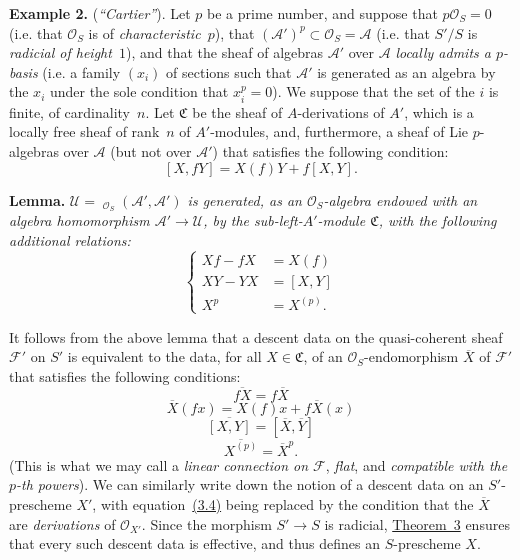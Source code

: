 \documentclass{article}
\newenvironment{itenv}[1]
  {\phantomsection\par\medskip\noindent\textbf{#1.}\itshape}
  {\par\medskip}
\newenvironment{rmenv}[1]
  {\phantomsection\par\medskip\noindent\textbf{#1.}\rmfamily}
  {\par\medskip}
\newcommand{\scr}[1]{{\mathscr{#1}}}
\renewcommand{\cal}[1]{{\mathcal{#1}}}
\newcommand{\fk}[1]{{\mathfrak{#1}}}
\DeclareMathOperator{\Hom}{Hom}
\DeclareMathOperator{\shHom}{\underline{\Hom}}
\newcommand{\oldpage}[1]{\marginpar{\footnotesize$\Big\vert$ \textit{p.~#1}}}
\begin{document}
\begin{rmenv}{Example 2}
\label{example:B.3(2)}
  (\emph{``Cartier''}).
  Let $p$ be a prime number, and suppose that $p\scr{O}_S=0$ (i.e. that $\scr{O}_S$ is of \emph{characteristic~$p$}), that $(\scr{A}')^p\subset\scr{O}_S=\scr{A}$ (i.e. that $S'/S$ is \emph{radicial of height~$1$}), and that the sheaf of algebras $\scr{A}'$ over $\scr{A}$ \emph{locally admits a $p$-basis} (i.e. a family $(x_i)$ of sections such that $\scr{A}'$ is generated as an algebra by the $x_i$ under the sole condition that $x_i^p=0$).
  We suppose that the set of the $i$ is finite, of cardinality~$n$.
  Let $\fk{C}$ be the sheaf of $A$-derivations of $A'$, which is a locally free sheaf of rank~$n$ of $A'$-modules, and, furthermore, a sheaf of Lie $p$-algebras over $\scr{A}$ (but not over $\scr{A}'$) that satisfies the following condition:
  \[
  \label{equation:B.3.5}
    [X,fY] = X(f)Y + f[X,Y].
  \tag{3.5}
  \]
\end{rmenv}

\begin{itenv}{Lemma}
  $\scr{U}=\shHom_{\scr{O}_S}(\scr{A}',\scr{A}')$ is generated, as an $\scr{O}_S$-algebra endowed with an algebra homomorphism $\scr{A}'\to\scr{U}$, by the sub-left-$A'$-module $\fk{C}$, with the following additional relations:
  \[
  \label{equation:B.3.6}
    \begin{cases}
      Xf-fX &= X(f)
    \\XY-YX &= [X,Y]
    \\X^p &= X^{(p)}.
    \end{cases}
  \tag{3.6}
  \]
\end{itenv}

It follows from the above lemma that a descent data on the quasi-coherent sheaf $\cal{F}'$ on $S'$ is equivalent to the data, for all $X\in\fk{C}$, of an $\scr{O}_S$-endomorphism $\overline{X}$ of $\cal{F}'$ that satisfies the following conditions:
\[
\label{equation:B.3.7}
  \overline{fX} = f\overline{X}
\tag{3.7}
\]
\[
\label{equation:B.3.8}
  \overline{X}(fx) = X(f)x + f\overline{X}(x)
\tag{3.8}
\]
\[
\label{equation:B.3.9}
  \overline{[X,Y]} = [\overline{X},\overline{Y}]
\tag{3.9}
\]
\[
\label{equation:B.3.10}
  \overline{X^{(p)}} = \overline{X}^p.
\tag{3.10}
\]
(This is what we may call a \emph{linear connection on $\cal{F}$}, \emph{flat}, and \emph{compatible with the $p$-th powers}).
We can similarly write down the notion of a descent data on an $S'$-prescheme $X'$, with equation~\hyperref[equation:B.3.4]{(3.4)} being replaced by the condition that the $\overline{X}$ are \emph{derivations} of $\scr{O}_{X'}$.
Since the morphism $S'\to S$ is radicial, \hyperref[theorem:B.1(3)]{Theorem~3} ensures that every such descent data is
\oldpage{190-24}
effective, and thus defines an $S$-prescheme $X$.
\end{document}
